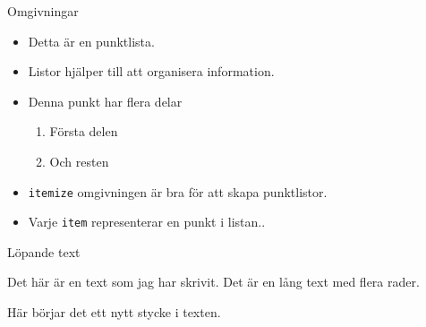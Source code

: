 \begin{Slide}{Omgivningar}\SlideFontTiny

  \begin{itemize}
  \end{itemize}

  \blankline
  \begin{exlatex}
\begin{itemize}
  \item Detta är en punktlista.
  \item Listor hjälper till att organisera information.
  \item Denna punkt har flera delar
  \begin{enumerate}
    \item Första delen
    \item Och resten
  \end{enumerate}
\end{itemize}
  \end{exlatex}

    \begin{itemize}
      \item \texttt{itemize} omgivningen är bra för att skapa punktlistor.
      \item Varje \texttt{item} representerar en punkt i listan..
    \end{itemize}
\end{Slide}



\begin{Slide}{Löpande text}
  \begin{itemize}
  \end{itemize}

  \blankline
  \begin{exlatex}
Det här      är en text
 som jag  har skrivit.
Det är
en lång text med flera
     rader.

Här börjar det ett
nytt stycke i texten.
  \end{exlatex}

\end{Slide}


